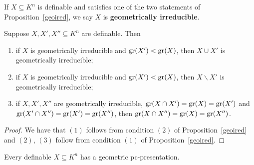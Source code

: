\noindent
If $X \subseteq K^n$ is definable and satisfies one of the two statements of Proposition~\ref{geoired}, we say $X$ is {\bf geometrically irreducible}. 

\begin{lem} \label{irredlemma}
Suppose $X, X', X'' \subseteq K^n$ are definable. Then
\begin{enumerate}
\item if $X$ is geometrically irreducible and $\mathrm{gr}(X')< \mathrm{gr}(X)$, then $X \cup X'$ is geometrically irreducible;
\item if $X$ is geometrically irreducible and $\mathrm{gr}(X')< \mathrm{gr}(X)$, then $X \backslash X'$ is geometrically irreducible;
\item if $X, X', X''$ are geometrically irreducible, $\mathrm{gr}(X \cap X')=\mathrm{gr}(X)=\mathrm{gr}(X')$ and $\mathrm{gr}(X'\cap X'') = \mathrm{gr}(X') = \mathrm{gr}(X'')$, then $\mathrm{gr}(X \cap X'') = \mathrm{gr}(X) =\mathrm{gr}(X'')$.
\end{enumerate}
\end{lem}
\begin{proof}
We have that $(1)$ follows from condition $(2)$ of Proposition~\ref{geoired} and $(2)$, $(3)$ follow from condition $(1)$ of Proposition~\ref{geoired}.
\end{proof}

\begin{comment}
\noindent
Suppose $\{T_\alpha \}_{\alpha \in D}$ and $\{T'_{\alpha'} \}_{\alpha' \in D'}$ are two essentially disjoint pc-presentations with respective primary index quotients $\widetilde{D}$ and $\widetilde{D}'$. We say $\{T_\alpha \}_{\alpha \in D}$ { \bf essentially contains} $\{T'_{\alpha'} \}_{\alpha' \in D'}$ if for most $\tilde{\alpha}' \in \widetilde{D}'$ there is $\tilde{\alpha} \in \widetilde{D}$ such that $T_\alpha \sim T'_{\alpha'}$. We say that $\{T_\alpha \}_{\alpha \in D}$ and $\{T'_{\alpha'} \}_{\alpha' \in D'}$ are { \bf essentially equivalent } if each of them essentially contains the other. 
\end{comment}





\begin{thm}
Every definable $X\subseteq K^n$ has a geometric pc-presentation. 
\end{thm}

